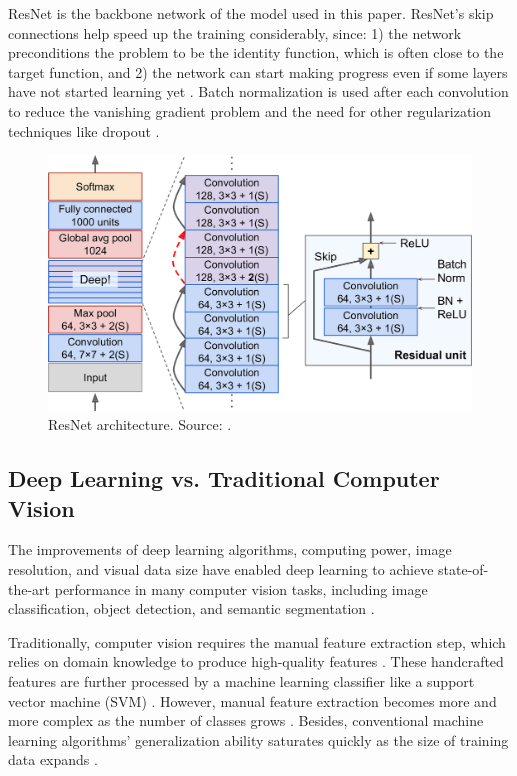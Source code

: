\documentclass[a4paper, 11pt, oneside]{article}
\begin{document}
ResNet is the backbone network of the model used in this paper. ResNet's skip connections help speed up the training
considerably, since: 1) the network preconditions the problem to be the identity function, which is often close to the
target function, and 2) the network can start making progress even if some layers have not started learning yet
\cite{geron2019hands, he2016deep}. Batch normalization \cite{ioffe2015batch} is used after each convolution
to reduce the vanishing gradient problem \cite{hochreiter1998vanishing} and the need for other regularization techniques
like dropout \cite{srivastava2014dropout}.

\begin{figure}[ht]
  \begin{center}
    \includegraphics[width=.6\textwidth]{resnet.png}
  \end{center}
  \caption{ResNet architecture. Source: \cite{geron2019hands}.}
\end{figure}

\subsection{Deep Learning vs. Traditional Computer Vision}

\label{sec:dlvscv}

The improvements of deep learning algorithms, computing power, image resolution, and visual data size have enabled deep
learning to achieve state-of-the-art performance in many computer vision tasks, including image
classification, object detection, and semantic segmentation \cite{qin2015underwater, voulodimos2018deep, o2019deep}.

Traditionally, computer vision requires the manual feature extraction step, which relies on domain knowledge to produce
high-quality features \cite{elgendy2020deep, zhao2019object, o2019deep}. These handcrafted features are further processed
by a machine learning classifier like a support vector machine (SVM) \cite{elgendy2020deep, zhao2019object, o2019deep}.
However, manual feature extraction becomes more and more complex as the number of classes grows \cite{o2019deep}.
Besides, conventional machine learning algorithms' generalization ability saturates quickly as the size of training data
expands \cite{qin2015underwater}.
\end{document}
